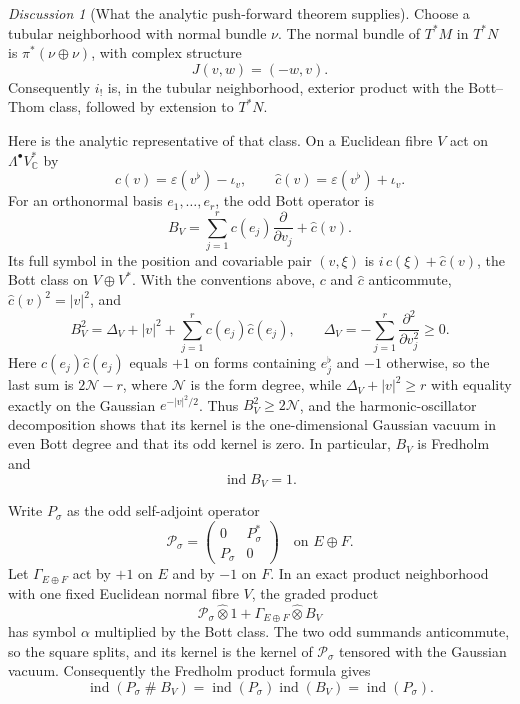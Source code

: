 \documentclass[11pt,oneside,reqno]{book}
\theoremstyle{plain}
\theoremstyle{definition}
\theoremstyle{remark}
\newtheorem*{discussion}{Discussion}
\begin{document}
\begin{discussion}[What the analytic push-forward theorem supplies]
Choose a tubular neighborhood with normal bundle \(\nu\). The normal
bundle of \(T^*M\) in \(T^*N\) is \(\pi^*(\nu\oplus\nu)\), with complex
structure
\[
 J(v,w)=(-w,v).
\]
Consequently \(i_!\) is, in the tubular neighborhood, exterior product
with the Bott--Thom class, followed by extension to \(T^*N\).

Here is the analytic representative of that class. On a Euclidean fibre
\(V\) act on \(\Lambda^\bullet V_\mathbb C^*\) by
\[
 c(v)=\varepsilon(v^\flat)-\iota_v,
 \qquad
 \widehat c(v)=\varepsilon(v^\flat)+\iota_v.
\]
For an orthonormal basis \(e_1,\ldots,e_r\), the odd Bott operator is
\[
 B_V=\sum_{j=1}^r c(e_j)\frac{\partial}{\partial v_j}
      +\widehat c(v).
\]
Its full symbol in the position and covariable pair \((v,\xi)\) is
\(i\,c(\xi)+\widehat c(v)\), the Bott class on \(V\oplus V^*\). With the
conventions above, \(c\) and \(\widehat c\) anticommute,
\(\widehat c(v)^2=|v|^2\), and
\[
 B_V^2=\Delta_V+|v|^2+
 \sum_{j=1}^r c(e_j)\widehat c(e_j),
 \qquad
 \Delta_V=-\sum_{j=1}^r\frac{\partial^2}{\partial v_j^2}\geq0.
\]
Here \(c(e_j)\widehat c(e_j)\) equals \(+1\) on forms containing
\(e_j^\flat\) and \(-1\) otherwise, so the last sum is \(2\mathcal N-r\),
where \(\mathcal N\) is the form degree, while
\(\Delta_V+|v|^2\geq r\) with equality exactly on the Gaussian
\(e^{-|v|^2/2}\).  Thus \(B_V^2\geq2\mathcal N\), and the harmonic-oscillator
decomposition shows that its kernel is the
one-dimensional Gaussian vacuum in even Bott degree and that its odd
kernel is zero. In particular, \(B_V\) is Fredholm and
\[
 \operatorname{ind}B_V=1.
\]

Write \(P_\sigma\) as the odd self-adjoint operator
\[
 \mathcal P_\sigma=
 \begin{pmatrix}0&P_\sigma^*\\ P_\sigma&0\end{pmatrix}
 \quad\text{on }E\oplus F.
\]
Let \(\Gamma_{E\oplus F}\) act by \(+1\) on \(E\) and by \(-1\) on
\(F\).  In an exact product neighborhood with one fixed Euclidean normal
fibre \(V\), the graded product
\[
 \mathcal P_\sigma\widehat\otimes 1
 +\Gamma_{E\oplus F}\widehat\otimes B_V
\]
has symbol \(\alpha\) multiplied by the Bott class.  The two odd summands
anticommute, so the square splits, and its kernel is the kernel of
\(\mathcal P_\sigma\) tensored with the Gaussian vacuum.  Consequently the Fredholm product formula gives
\[
 \operatorname{ind}(P_\sigma\mathbin{\#}B_V)
 =\operatorname{ind}(P_\sigma)\operatorname{ind}(B_V)
 =\operatorname{ind}(P_\sigma).
\]


\end{discussion}
\end{document}
